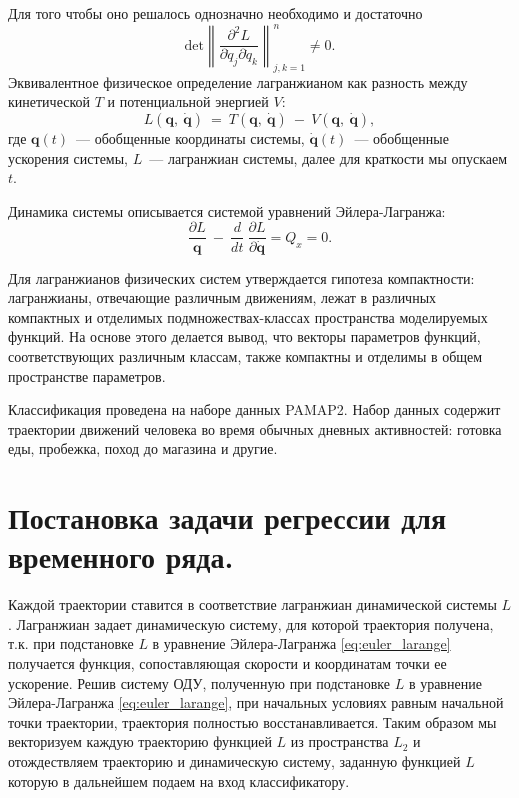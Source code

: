 \documentclass[a4paper, 12pt]{article}
\begin{document}
Для того чтобы оно решалось однозначно необходимо и достаточно
\begin{equation}
    \text{det} \left \| \frac{\partial^{2} L}{\partial \dot{q}_{j}\partial \dot{q}_{k}} \right \|_{j,k=1}^{n} \neq 0.
\end{equation}
Эквивалентное физическое определение лагранжианом как разность между кинетической $T$ и потенциальной энергией $V$: 
\begin{equation}
L\left(\mathbf{q},\ \dot{\mathbf{q}}\right) \ =\ T\left(\mathbf{q},\ \dot{\mathbf{q}}\right)\ -\ V\left(\mathbf{q},\ \dot{\mathbf{q}}\right), 
\end{equation}
где $\mathbf{q}(t)$~--- обобщенные координаты системы, $\dot{\mathbf{q}}(t)$~--- обобщенные ускорения системы, $L$~--- лагранжиан системы, далее для краткости мы опускаем $t$.

Динамика системы описывается системой уравнений Эйлера-Лагранжа:
\begin{equation}
 \frac{\partial L}{\mathbf{q}}\ -\ \frac{d}{dt}\ \frac{\partial L}{\partial\dot{\mathbf{q}}}=Q_x=0. \label{eq:euler_larange}
\end{equation}

Для лагранжианов физических систем утверждается гипотеза компактности: лагранжианы, отвечающие различным движениям, лежат в различных компактных и отделимых подмножествах-классах пространства моделируемых функций. На основе этого делается вывод, что векторы параметров функций, соответствующих различным классам, также компактны и отделимы в общем пространстве параметров. 

Классификация проведена на наборе данных PAMAP2. Набор данных содержит траектории движений человека во время обычных дневных активностей: готовка еды, пробежка, поход до магазина и другие.
	
	\section{Постановка задачи регрессии для временного ряда.} \label{sec:regression}

Каждой траектории ставится в соответствие лагранжиан динамической системы $L$. Лагранжиан задает динамическую систему, для которой траектория получена, т.к. при подстановке $L$ в уравнение Эйлера-Лагранжа \eqref{eq:euler_larange} получается функция, сопоставляющая скорости и координатам точки ее ускорение. Решив систему ОДУ, полученную при подстановке $L$ в уравнение Эйлера-Лагранжа \eqref{eq:euler_larange}, при начальных условиях равным начальной точки траектории, траектория полностью восстанавливается. Таким образом мы векторизуем каждую траекторию функцией $L$ из пространства $L_2$ и отождествляем траекторию и динамическую систему, заданную функцией  $L$ которую в дальнейшем подаем на вход классификатору.
\end{document}
